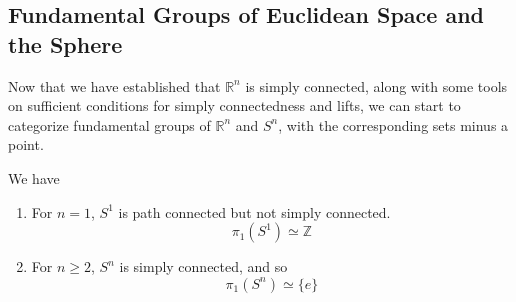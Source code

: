 \subsection{Fundamental Groups of Euclidean Space and the Sphere}

  Now that we have established that $\mathbb{R}^n$ is simply connected, along with some tools on sufficient conditions for simply connectedness and lifts, we can start to categorize fundamental groups of $\mathbb{R}^n$ and $S^n$, with the corresponding sets minus a point. 

  \begin{theorem}
    We have 
    \begin{enumerate}
      \item For $n = 1$, $S^1$ is path connected but not simply connected. 
        \begin{equation}
          \pi_1 (S^1) \simeq \mathbb{Z}
        \end{equation}

      \item For $n \geq 2$, $S^n$ is simply connected, and so 
        \begin{equation}
          \pi_1 (S^n) \simeq \{e\}
        \end{equation}
    \end{enumerate}
  \end{theorem}
